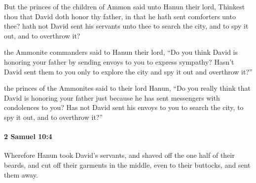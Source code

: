 			\begin{versebox}
					\item[BHS] 
					\item[ASV] But the princes of the children of Ammon said unto Hanun their lord, Thinkest thou that David doth honor thy father, in that he hath sent comforters unto thee? hath not David sent his servants unto thee to search the city, and to spy it out, and to overthrow it?
					\item[NIV] the Ammonite commanders said to Hanun their lord, “Do you think David is honoring your father by sending envoys to you to express sympathy? Hasn’t David sent them to you only to explore the city and spy it out and overthrow it?”
					\item[NRSV] the princes of the Ammonites said to their lord Hanun, “Do you really think that David is honoring your father just because he has sent messengers with condolences to you? Has not David sent his envoys to you to search the city, to spy it out, and to overthrow it?”
			\end{versebox}

		\paragraph{2 Samuel 10:4} %
			\label{2SAMUEL-10-4}

			Wherefore Hanun took David’s servants, and shaved off the one half of their beards, and cut off their garments in the middle, even to their buttocks, and sent them away.

